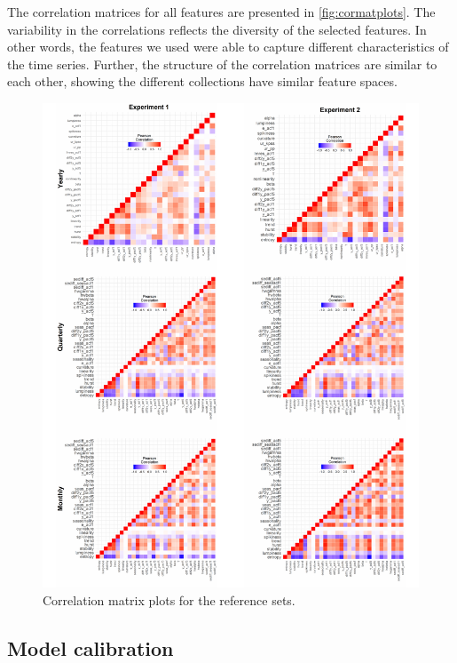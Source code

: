 \documentclass[11pt,a4paper,]{article}
\theoremstyle{definition}
\theoremstyle{definition}
\theoremstyle{definition}
\theoremstyle{remark}
\begin{document}
The correlation matrices for all features are presented in
\autoref{fig:cormatplots}. The variability in the correlations reflects
the diversity of the selected features. In other words, the features we
used were able to capture different characteristics of the time series.
Further, the structure of the correlation matrices are similar to each
other, showing the different collections have similar feature spaces.

\begin{figure}

{\centering \includegraphics[width=\textwidth]{figure/cormatplots-1} 

}

\caption{ Correlation matrix plots for the reference sets.}\label{fig:cormatplots}
\end{figure}

\subsection{Model calibration}\label{model-calibration}
\end{document}
